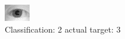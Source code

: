 \begin{figure}[h!]
\begin{center}
\includegraphics[width=0.60\columnwidth]{figures/ID1123_class_2_target_3.png}
\end{center}
\caption{ Classification: 2 actual target: 3}
\label{fig:ID1123_class_2_target_3}
\end{figure}
